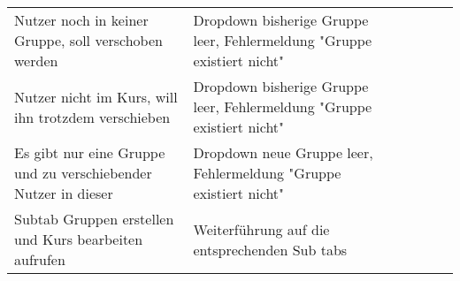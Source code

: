 \begin{table}[]
\begin{tabular}{p{6cm}p{7cm}p{3cm}llll}
		Nutzer noch in keiner Gruppe, soll verschoben werden                                                                                 & Dropdown bisherige Gruppe leer, Fehlermeldung "Gruppe existiert nicht"                                                                                           & \checkmark           &  &  &  \\
		Nutzer nicht im Kurs, will ihn trotzdem verschieben                                                                                  & Dropdown bisherige Gruppe leer, Fehlermeldung "Gruppe existiert nicht"                                                                                           & \checkmark           &  &  &  \\
		Es gibt nur eine Gruppe und zu verschiebender Nutzer in dieser                                                                       & Dropdown neue  Gruppe leer, Fehlermeldung "Gruppe existiert nicht"                                                                                               & \checkmark           &  &  &  \\
		Subtab Gruppen erstellen und Kurs bearbeiten aufrufen                                                                                & Weiterführung auf die entsprechenden Sub tabs                                                                                                                    & \checkmark           &  &  &  \\
		
		
			\end{tabular}
\end{table}
